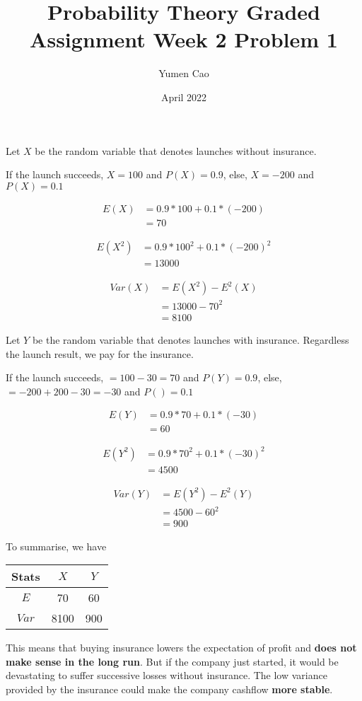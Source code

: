 \documentclass[12pt]{article}
\title{Probability Theory Graded Assignment Week 2 Problem 1}
\author{Yumen Cao}
\date{April 2022}
\begin{document}
\maketitle

Let $X$ be the random variable that denotes launches without insurance.

If the launch succeeds, $X=100$ and $P(X)=0.9$, else, $X=-200$ and $P(X)=0.1$

\begin{align}
E(X) &= 0.9*100 + 0.1* (-200) \\
&= 70
\end{align}

\begin{align}
E(X^2) &= 0.9*100^2 + 0.1* (-200)^2 \\
&= 13000
\end{align}


\begin{align}
Var(X) &= E(X^2) - E^2(X) \\
&= 13000 - 70^2 \\
&= 8100
\end{align}

Let $Y$ be the random variable that denotes launches with insurance. Regardless the launch result, we pay for the insurance.

If the launch succeeds, $=100 - 30 = 70$ and $P(Y)=0.9$, else, $=-200 + 200 -30 = -30$ and $P()=0.1$

\begin{align}
E(Y) &= 0.9*70 + 0.1* (-30) \\
&= 60
\end{align}

\begin{align}
E(Y^2) &= 0.9*70^2 + 0.1* (-30)^2 \\
&= 4500
\end{align}


\begin{align}
Var(Y) &= E(Y^2) - E^2(Y) \\
&= 4500 -60^2 \\
&= 900
\end{align}


To summarise, we have
\begin{center}
\begin{tabular}{||c| c |c||} 
 \hline
 Stats & $X$ & $Y$ \\ [0.5ex] 
 \hline
 \hline
 $E$ & 70 & 60 \\
 \hline
 $Var$ & 8100 & 900 \\
 \hline
\end{tabular}
\end{center}

 
 This means that buying insurance lowers the expectation of profit and {\bf does not make sense in the long run}. But if the company just started, it would be devastating to suffer successive losses without insurance. The low variance provided by the insurance could make the company cashflow {\bf more stable}.
\end{document}
